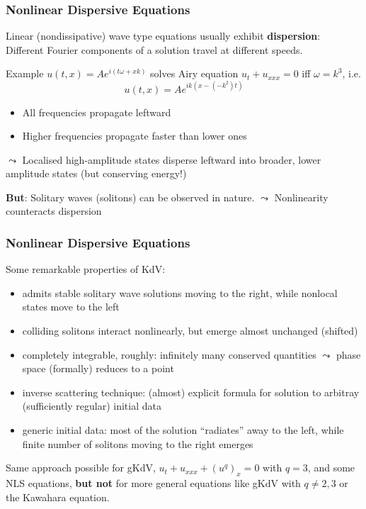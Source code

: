 \documentclass[9pt, english]{beamer}
\theoremstyle{definition}
\begin{document}
\begin{frame}
  \frametitle{Nonlinear Dispersive Equations}
Linear (nondissipative) wave type equations usually exhibit  {\bf dispersion}:\\
\vspace{0.15cm}
\hspace{0.25cm} Different Fourier components of a solution travel at different speeds.\\
\vspace{0.15cm}
\begin{block}{Example}
$u(t,x)=Ae^{i(t\omega + xk)}$ solves Airy equation $u_t + u_{xxx} =
0$ iff $\omega = k^3$, i.e.$$u(t,x)=Ae^{ik(x -  (-k^2)t)}$$
\vspace{-0.5cm}
\begin{itemize}
 \item All frequencies propagate leftward
 \item Higher frequencies propagate faster than lower ones
\end{itemize}
$\leadsto$ Localised high-amplitude states disperse leftward into
broader, lower amplitude states (but conserving energy!)
\end{block}
\vspace{0.25cm} {\bf But}: Solitary waves (solitons) can be observed
in nature. $\leadsto$ Nonlinearity counteracts dispersion
\end{frame}

\begin{frame}
  \frametitle{Nonlinear Dispersive Equations}
Some remarkable properties of KdV:
\begin{itemize}
 \item admits stable solitary wave solutions moving to the right, while nonlocal states move to the left
 \item colliding solitons interact nonlinearly, but emerge almost unchanged (shifted)
 \item completely integrable, roughly: infinitely many conserved quantities $\leadsto$ phase space (formally) reduces to
a point
 \item inverse scattering technique: (almost) explicit formula for solution to arbitray (sufficiently regular) initial
data
 \item generic initial data: most of the solution ``radiates'' away to the left, while finite number of solitons moving
to the right emerges
\end{itemize}
Same approach possible for gKdV, $u_t + u_{xxx} + (u^q)_x = 0$ with
$q=3$, and some NLS equations, {\bf but not} for more general
equations like gKdV with $q\not=2,3$ or the Kawahara equation.
\end{frame}
\end{document}
